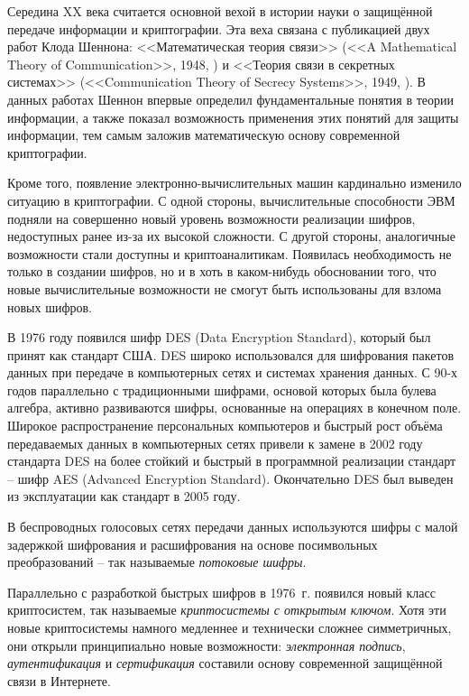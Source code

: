 Середина XX века считается основной вехой в истории науки о защищённой передаче информации и криптографии. Эта веха связана с публикацией двух работ Клода Шеннона: <<Математическая теория связи>> (<<A Mathematical Theory of Communication>>, 1948, \cite{Shannon:1948:MTCa, Shannon:1948:MTCb}) и <<Теория связи в секретных системах>> (<<Communication Theory of Secrecy Systems>>, 1949, \cite{Shannon:1949:CTS}). В данных работах Шеннон впервые определил фундаментальные понятия в теории информации, а также показал возможность применения этих понятий для защиты информации, тем самым заложив математическую основу современной криптографии.

Кроме того, появление электронно-вычислительных машин кардинально изменило ситуацию в криптографии. С одной стороны, вычислительные способности ЭВМ подняли на совершенно новый уровень возможности реализации шифров, недоступных ранее из-за их высокой сложности. С другой стороны, аналогичные возможности стали доступны и криптоаналитикам. Появилась необходимость не только в создании шифров, но и в хоть в каком-нибудь обосновании того, что новые вычислительные возможности не смогут быть использованы для взлома новых шифров.

В 1976 году появился шифр DES (Data Encryption Standard), который был принят как стандарт США. DES широко использовался для шифрования пакетов данных при передаче в компьютерных сетях и системах хранения данных. С 90-х годов параллельно с традиционными шифрами, основой которых была булева алгебра, активно развиваются шифры, основанные на операциях в конечном поле. Широкое распространение персональных компьютеров и быстрый рост объёма передаваемых данных в компьютерных сетях привели к замене в 2002 году стандарта DES на более стойкий и быстрый в программной реализации стандарт -- шифр AES (Advanced Encryption Standard). Окончательно DES был выведен из эксплуатации как стандарт в 2005 году.

В беспроводных голосовых сетях передачи данных используются шифры с малой задержкой шифрования и расшифрования на основе посимвольных преобразований -- так называемые \emph{потоковые шифры}.


Параллельно с разработкой быстрых шифров в 1976~г. появился новый класс криптосистем, так называемые \emph{криптосистемы с открытым ключом}. Хотя эти новые криптосистемы намного медленнее и технически сложнее симметричных, они открыли принципиально новые возможности: \emph{электронная подпись}, \emph{аутентификация} и \emph{сертификация} составили основу современной защищённой связи в Интернете.

